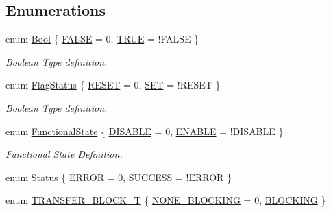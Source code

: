 \subsection*{Enumerations}
\begin{DoxyCompactItemize}
\item 
enum \hyperlink{group__LPC__Types__Public__Types_ga39db6982619d623273fad8a383489309}{Bool} \{ \hyperlink{group__LPC__Types__Public__Types_gga39db6982619d623273fad8a383489309aa1e095cc966dbecf6a0d8aad75348d1a}{F\-A\-L\-S\-E} = 0, 
\hyperlink{group__LPC__Types__Public__Types_gga39db6982619d623273fad8a383489309aa82764c3079aea4e60c80e45befbb839}{T\-R\-U\-E} = !\-F\-A\-L\-S\-E
 \}
\begin{DoxyCompactList}\small\item\em Boolean Type definition. \end{DoxyCompactList}\item 
enum \hyperlink{group__LPC__Types__Public__Types_ga89136caac2e14c55151f527ac02daaff}{Flag\-Status} \{ \hyperlink{group__LPC__Types__Public__Types_gga89136caac2e14c55151f527ac02daaffa589b7d94a3d91d145720e2fed0eb3a05}{R\-E\-S\-E\-T} = 0, 
\hyperlink{group__LPC__Types__Public__Types_gga89136caac2e14c55151f527ac02daaffab44c8101cc294c074709ec1b14211792}{S\-E\-T} = !\-R\-E\-S\-E\-T
 \}
\begin{DoxyCompactList}\small\item\em Boolean Type definition. \end{DoxyCompactList}\item 
enum \hyperlink{group__LPC__Types__Public__Types_gac9a7e9a35d2513ec15c3b537aaa4fba1}{Functional\-State} \{ \hyperlink{group__LPC__Types__Public__Types_ggac9a7e9a35d2513ec15c3b537aaa4fba1ad3a9df141be0ccf10389b640f492b26d}{D\-I\-S\-A\-B\-L\-E} = 0, 
\hyperlink{group__LPC__Types__Public__Types_ggac9a7e9a35d2513ec15c3b537aaa4fba1a7d46875fa3ebd2c34d2756950eda83bf}{E\-N\-A\-B\-L\-E} = !\-D\-I\-S\-A\-B\-L\-E
 \}
\begin{DoxyCompactList}\small\item\em Functional State Definition. \end{DoxyCompactList}\item 
enum \hyperlink{group__LPC__Types__Public__Types_ga67a0db04d321a74b7e7fcfd3f1a3f70b}{Status} \{ \hyperlink{group__LPC__Types__Public__Types_gga67a0db04d321a74b7e7fcfd3f1a3f70ba2fd6f336d08340583bd620a7f5694c90}{E\-R\-R\-O\-R} = 0, 
\hyperlink{group__LPC__Types__Public__Types_gga67a0db04d321a74b7e7fcfd3f1a3f70bac7f69f7c9e5aea9b8f54cf02870e2bf8}{S\-U\-C\-C\-E\-S\-S} = !\-E\-R\-R\-O\-R
 \}
\item 
enum \hyperlink{group__LPC__Types__Public__Types_gaf5297347bed33665c55dd0e9c7840403}{T\-R\-A\-N\-S\-F\-E\-R\-\_\-\-B\-L\-O\-C\-K\-\_\-\-T} \{ \hyperlink{group__LPC__Types__Public__Types_ggaf5297347bed33665c55dd0e9c7840403ae00130e64382c35d172d226b79aa9acb}{N\-O\-N\-E\-\_\-\-B\-L\-O\-C\-K\-I\-N\-G} = 0, 
\hyperlink{group__LPC__Types__Public__Types_ggaf5297347bed33665c55dd0e9c7840403a854a1cd6e3a98db9e290dddea29725e7}{B\-L\-O\-C\-K\-I\-N\-G}
 \}
\end{DoxyCompactItemize}



